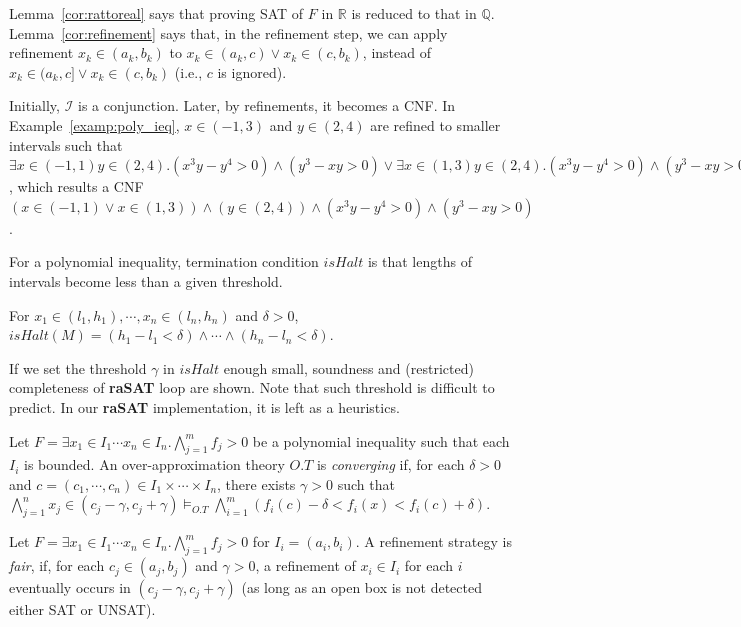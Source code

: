 \documentclass[runningheads,a4paper,oribibl]{llncs}
\newcommand{\Real}{{\mathbb R}}
\newcommand{\Rat}{{\mathbb Q}}
\newcommand{\mizuhito}[1]{\{{\bf Mizuhito:~\sf #1}\}} %
\begin{document}
Lemma~\ref{cor:rattoreal} says that proving SAT of $F$ in $\Real$ is reduced to 
that in $\Rat$. 
Lemma~\ref{cor:refinement} says that, in the refinement step, we can apply refinement 
$x_k \in (a_k,b_k)$ to $x_k \in (a_k,c) \vee x_k \in (c,b_k)$, 
instead of $x_k \in (a_k,c] \vee x_k \in (c,b_k) $
(i.e., $c$ is ignored). 

Initially, ${\mathcal I}$ is a conjunction. Later, by refinements, it becomes a CNF. 
In Example~\ref{examp:poly_ieq}, 
$x \in (-1,3)$ and $y \in (2,4)$ are refined to smaller intervals
such that 
$\exists x \in (-1,1) y \in (2,4) . (x^3y - y^4 > 0) \wedge (y^3 -xy >0) \vee 
 \exists x \in (1,3) y \in (2,4) . (x^3y - y^4 > 0) \wedge (y^3 -xy >0)$, 
which results a CNF 
$(x \in (-1,1) \vee x \in (1,3)) \wedge (y \in (2,4)) \wedge (x^3y - y^4 > 0) \wedge (y^3 -xy >0)$.

For a polynomial inequality, termination condition $isHalt$ is 
that lengths of intervals become less than a given threshold.

\begin{definition} \label{def:ishalt}
For $x_1 \in (l_1,h_1), \cdots, x_n \in (l_n,h_n)$ and $\delta > 0$, 
$isHalt (M)= (h_1-l_1 < \delta) \wedge \cdots \wedge (h_n-l_n < \delta)$.
\end{definition}

If we set the threshold $\gamma$ in $isHalt$ enough small, 
soundness and (restricted) completeness of {\bf raSAT} loop are shown.  
Note that such threshold is difficult to predict. 
In our {\bf raSAT} implementation, it is left as a heuristics. 

\begin{definition} \label{def:completeOT}
Let
$F = \exists x_1 \in I_1 \cdots x_n \in I_n. \bigwedge \limits_{j=1}^m f_j > 0$
be a polynomial inequality such that each $I_i$ is bounded. 
An over-approximation theory $O.T$ is {\em converging} 
if, for each $\delta > 0$ and $c = (c_1, \cdots, c_n) \in I_1 \times \cdots \times I_n$, 
there exists $\gamma > 0$ such that 
$\bigwedge \limits_{j=1}^n x_j \in (c_j - \gamma, c_j + \gamma) \models_{O.T} 
 \bigwedge \limits_{i=1}^m (f_i(c) - \delta < f_i(x) < f_i(c) + \delta)$. 
\end{definition}

\begin{definition} 
Let
$F = \exists x_1 \in I_1 \cdots x_n \in I_n. \bigwedge \limits_{j=1}^m f_j > 0$
for $I_i = (a_i,b_i)$.
A refinement strategy is {\em fair}, if, for each $c_j \in (a_j,b_j)$ and $\gamma > 0$, 
a refinement of $x_i \in I_i$ for each $i$ eventually occurs in $(c_j - \gamma, c_j + \gamma)$ 
(as long as an open box is not detected either SAT or UNSAT). 
\end{definition}
\end{document}
